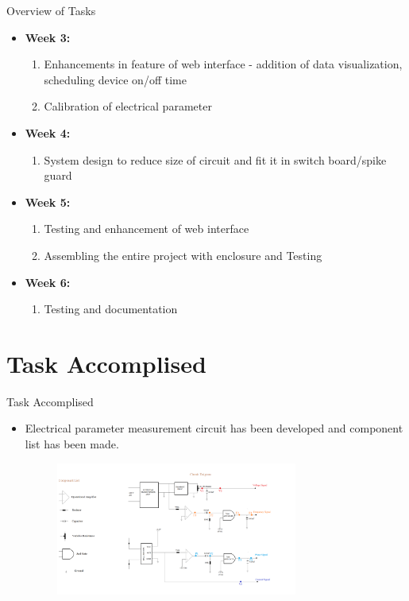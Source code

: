 \documentclass[10pt, a4paper]{beamer}
\begin{document}
\begin{frame}{Overview of Tasks}
	\begin{itemize}
		\item \textbf{Week 3:}
		\begin{enumerate}
			\item Enhancements in feature of web interface - addition of data visualization, scheduling device on/off time
			\item Calibration of electrical parameter
		\end{enumerate}
		\item \textbf{Week 4:}
		\begin{enumerate}
			\item System design to reduce size of circuit and fit it in switch board/spike guard
		\end{enumerate}
		\item \textbf{Week 5:}
		\begin{enumerate}
			\item Testing and enhancement of web interface
			\item Assembling the entire project with enclosure and Testing
		\end{enumerate}
		\item \textbf{Week 6:}
		\begin{enumerate}
			\item Testing and documentation
		\end{enumerate}
	\end{itemize}
\end{frame}

\section{Task Accomplised}
\begin{frame}{Task Accomplised}
	\begin{itemize}
		\item Electrical parameter measurement circuit has been developed and component list has been made.   
		\begin{figure}[h]
			\includegraphics[width=300px]{circuit}
		\end{figure}
	\end{itemize}
\end{frame}
\end{document}
